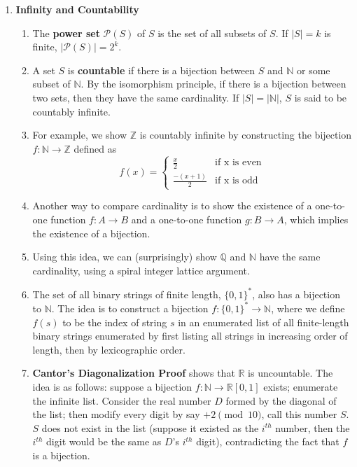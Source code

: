 \documentclass[10pt]{article}
\begin{document}
\begin{multicols}{2}
\begin{enumerate}
        \item \textbf{Infinity and Countability}
        \begin{enumerate}
            \item The \textbf{power set} $\mathcal{P}(S)$ of $S$ is the set of all subsets of $S$. If $|S|=k$ is finite, $|\mathcal{P}(S)| = 2^k$.
            \item A set $S$ is \textbf{countable} if there is a bijection between $S$ and $\mathbb{N}$ or some subset of $\mathbb{N}$. By the isomorphism principle, if there is a bijection between two sets, then they have the same cardinality. If $|S|=|\mathbb{N}|$, $S$ is said to be countably infinite.
            \item For example, we show $\mathbb{Z}$ is countably infinite by constructing the bijection $f: \mathbb{N} \rightarrow \mathbb{Z}$ defined as
            \[ f(x) =
            \begin{cases} 
                  \frac{x}{2} & \text{if x is even} \\
                  \frac{-(x+1)}{2} & \text{if x is odd} 
               \end{cases}
            \]
            \item Another way to compare cardinality is to show the existence of a one-to-one function $f:A \rightarrow B$ and a one-to-one function $g:B \rightarrow A$, which implies the existence of a bijection.
            \item Using this idea, we can (surprisingly) show $\mathbb{Q}$ and $\mathbb{N}$ have the same cardinality, using a spiral integer lattice argument. 
            \item The set of all binary strings of finite length, $\{0,1\}^*$, also has a bijection to $\mathbb{N}$. The idea is to construct a bijection $f: \{0,1\}^* \rightarrow \mathbb{N}$, where we define $f(s)$ to be the index of string $s$ in an enumerated list of all finite-length binary strings enumerated by first listing all strings in increasing order of length, then by lexicographic order.
            \item \textbf{Cantor's Diagonalization Proof} shows that $\mathbb{R}$ is uncountable. The idea is as follows: suppose a bijection $f: \mathbb{N} \rightarrow \mathbb{R}[0,1]$ exists; enumerate the infinite list. Consider the real number $D$ formed by the diagonal of the list; then modify every digit by say $+2 \pmod{10}$, call this number $S$. $S$ does not exist in the list (suppose it existed as the $i^{th}$ number, then the $i^{th}$ digit would be the same as $D$'s $i^{th}$ digit), contradicting the fact that $f$ is a bijection.

\end{enumerate}
\end{enumerate}
\end{multicols}
\end{document}

